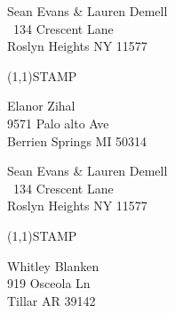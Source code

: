 \documentclass[12pt]{article}
\begin{document}
\begin{minipage}{.5\linewidth} \noindent
Sean Evans \& Lauren Demell\\\ 
134 Crescent Lane\\ 
Roslyn Heights NY 11577
\end{minipage}
\begin{minipage}{.5\linewidth \hspace{-.2in} \vspace{-.3in}}
\begin{flushright}
\framebox(1,1){STAMP}
\end{flushright}
\end{minipage}

\begin{center} \begin{Huge} \vspace*{\fill}
Elanor Zihal\\
9571 Palo alto Ave\\
Berrien Springs MI 50314\\
\vspace{\fill} \end{Huge} \end{center}

\clearpage

\begin{minipage}{.5\linewidth} \noindent
Sean Evans \& Lauren Demell\\\ 
134 Crescent Lane\\ 
Roslyn Heights NY 11577
\end{minipage}
\begin{minipage}{.5\linewidth \hspace{-.2in} \vspace{-.3in}}
\begin{flushright}
\framebox(1,1){STAMP}
\end{flushright}
\end{minipage}

\begin{center} \begin{Huge} \vspace*{\fill}
Whitley Blanken\\
919 Osceola Ln\\
Tillar AR 39142\\
\vspace{\fill} \end{Huge} \end{center}

\clearpage
\end{document}
